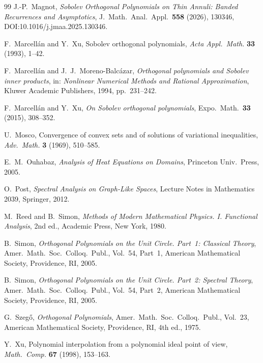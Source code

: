 \documentclass{amsart}
\numberwithin{equation}{section}
\theoremstyle{definition}
\theoremstyle{remark}
\begin{document}
\begin{thebibliography}{99}
 J.-P.~Magnot,
\emph{Sobolev Orthogonal Polynomials on Thin Annuli: Banded Recurrences and Asymptotics},
J.\ Math.\ Anal.\ Appl.\ \textbf{558} (2026), 130346, DOI:10.1016/j.jmaa.2025.130346.

F.~Marcell\'an and Y.~Xu,
Sobolev orthogonal polynomials,
\emph{Acta Appl.\ Math.} \textbf{33} (1993), 1--42.

F.~Marcell\'an and J.~J.~Moreno-Balc\'azar,
\emph{Orthogonal polynomials and Sobolev inner products},
in: \emph{Nonlinear Numerical Methods and Rational Approximation},
Kluwer Academic Publishers, 1994, pp.~231--242.

 F.~Marcell\'an and Y.~Xu,
 \emph{On Sobolev orthogonal polynomials}, Expo.\ Math.\ \textbf{33} (2015), 308--352.

U.~Mosco,
Convergence of convex sets and of solutions of variational inequalities,
\emph{Adv.\ Math.} \textbf{3} (1969), 510--585.

E.~M.~Ouhabaz,
\emph{Analysis of Heat Equations on Domains},
Princeton Univ.\ Press, 2005.

O.~Post,
\emph{Spectral Analysis on Graph-Like Spaces},
Lecture Notes in Mathematics 2039, Springer, 2012.

M.~Reed and B.~Simon,
\emph{Methods of Modern Mathematical Physics. I. Functional Analysis},
2nd ed., Academic Press, New York, 1980.

B.~Simon,
\emph{Orthogonal Polynomials on the Unit Circle. Part~1: Classical Theory},
Amer.\ Math.\ Soc.\ Colloq.\ Publ., Vol.~54, Part~1,
American Mathematical Society, Providence, RI, 2005.

B.~Simon,
\emph{Orthogonal Polynomials on the Unit Circle. Part~2: Spectral Theory},
Amer.\ Math.\ Soc.\ Colloq.\ Publ., Vol.~54, Part~2,
American Mathematical Society, Providence, RI, 2005.

G.~Szeg\H{o},
\emph{Orthogonal Polynomials},
Amer.\ Math.\ Soc.\ Colloq.\ Publ., Vol.~23,
American Mathematical Society, Providence, RI, 4th ed., 1975.

Y.~Xu,
Polynomial interpolation from a polynomial ideal point of view,
\emph{Math.\ Comp.} \textbf{67} (1998), 153--163.



\end{thebibliography}
\end{document}

